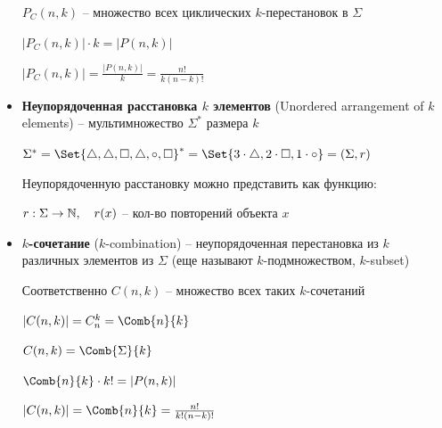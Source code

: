 \documentclass[12pt]{article}
\begin{document}
\begin{itemize}

        $P_C(n, k)$ -- множество всех циклических $k$-перестановок в $\Sigma$

        $|P_C(n, k)| \cdot k = |P(n, k)|$

        $|P_C(n, k)| = \frac{|P(n, k)|}{k} = \frac{n!}{k(n - k)!}$

        \mediumvspace

        \hypertarget{unorderedarrangement}{}

        \item \textbf{Неупорядоченная расстановка $k$ элементов} (Unordered arrangement of $k$ elements) -- мультимножество $\Sigma^*$ размера $k$

        \Ex $\Sigma^* = \Set{\triangle, \triangle, \Box, \triangle, \circ, \Box}^* = \Set{3 \cdot \triangle, 2 \cdot \Box, 1 \cdot \circ} = (\Sigma, r)$

        Неупорядоченную расстановку можно представить как функцию:

        $r : \Sigma \to \mathbb{N}, \quad r(x)$ -- кол-во повторений объекта $x$

        \mediumvspace

        \hypertarget{kcombination}{}

        \item \textbf{$k$-сочетание} ($k$-combination) -- неупорядоченная перестановка из $k$ различных элементов из $\Sigma$ (еще называют $k$-подмножеством, $k$-subset)

        Соответственно $C(n, k)$ -- множество всех таких $k$-сочетаний

        $|C(n, k)| = C^k_n = \Comb{n}{k}$

        $C(n, k) = \Comb{\Sigma}{k}$

        $\Comb{n}{k} \cdot k! = |P(n, k)|$

        $|C(n, k)| = \Comb{n}{k} = \frac{n!}{k!(n - k)!}$

    \end{itemize}
\end{document}
